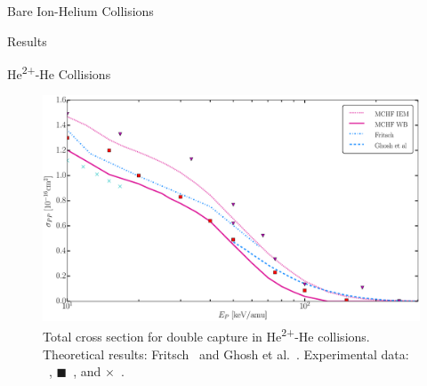 \documentclass[a5paper, 9 pt]{extreport}
\begin{document}
\begin{chapter}{Bare Ion-Helium Collisions \label{chap:p-he2p-he}}
\begin{section}{Results \label{sec:phe2p-res}}
\begin{subsection}{\texorpdfstring{He\textsuperscript{2+}}{He2+}-He Collisions
                         \label{sec:he2phe-res}}
         \begin{figure}[h]
            \centering
            \includegraphics[width = 0.95 \linewidth]{./images/he2phe/he2phe-PP.eps}
            \caption[Total cross section for double capture in He\textsuperscript{2+}-He
                     collisions.]{Total cross section for double capture in He\textsuperscript{2+}-He
                     collisions.
                     Theoretical results: Fritsch~\cite{Fritsch-94} and Ghosh
                     et al.~\cite{GDMP-08}.
                     Experimental data: {\color{RedViolet}{$\blacktriangledown$}}~\cite{Dubois87},
                     {\color{red}$\blacksquare$}~\cite{Rudd85}, and
                     {\color{TealBlue}$\times$}~\cite{SG74}. \label{fig:he2phe-pp}}
         \end{figure}


\end{subsection}
\end{section}
\end{chapter}
\end{document}

